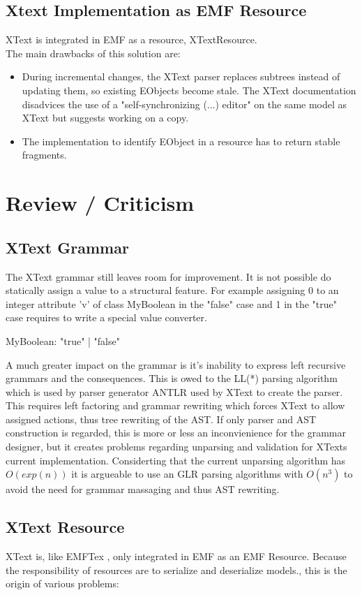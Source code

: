 \subsection{Xtext Implementation as EMF  Resource}
XText is integrated in EMF as a resource, XTextResource.\\
The main drawbacks of this solution are:
\begin{itemize}
	\item During incremental changes, the XText parser replaces subtrees instead of updating them, so existing EObjects become stale. The XText documentation disadvices the use of a "self-synchronizing (...) editor" on the same model as XText but suggests working on a copy.
	\item The implementation to identify EObject in a resource has to return stable fragments.
\end{itemize}

\section{Review / Criticism}
\subsection{XText Grammar}
The XText grammar still leaves room for improvement. It is not possible do statically assign a value  to a structural feature. For example assigning 0 to an integer attribute 'v' of class MyBoolean in the "false" case and 1 in the "true" case requires to write a special value converter. 
\begin{xtxt}
MyBoolean:  "true" | "false"
\end{xtxt}

A much greater impact on the grammar is it's inability to express left recursive grammars and the consequences. This is owed to the LL(*) parsing algorithm which is used by parser generator ANTLR used by XText to create the parser. This requires left factoring and grammar rewriting which forces XText to allow assigned actions, thus tree rewriting of the AST. If only parser and AST construction is regarded, this is more or less an inconvienience for the grammar designer, but it creates problems regarding unparsing and validation for XTexts current implementation. Considerting that the current unparsing algorithm has $O(exp(n))$ it is argueable to use an GLR parsing algorithms with  $O(n^3)$ to avoid the need for grammar massaging and thus AST rewriting.

\subsection{XText Resource}
XText is, like EMFTex \cite{EMFTextMan}, only integrated in EMF as an EMF Resource. Because the responsibility of resources are to serialize and deserialize models., this is the origin of various problems: 

